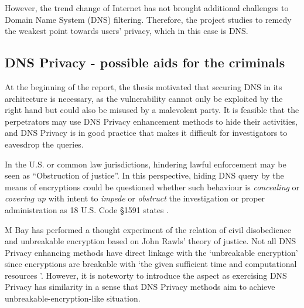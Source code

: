 However, the trend change of Internet has not brought additional challenges to Domain Name System (DNS) filtering. Therefore, the project studies to remedy the weakest point towards users' privacy, which in this case is DNS.

\subsection{DNS Privacy - possible aids for the criminals}
At the beginning of the report, the thesis motivated that securing DNS in its architecture is necessary, as the vulnerability cannot only be exploited by the right hand but could also be misused by a malevolent party.
It is feasible that the perpetrators may use DNS Privacy enhancement methods to hide their activities, and DNS Privacy is in good practice that makes it difficult for investigators to eavesdrop the queries.

In the U.S. or common law jurisdictions, hindering lawful enforcement may be seen as ``Obstruction of justice''.
In this perspective, hiding DNS query by the means of encryptions could be questioned whether such behaviour is \textit{concealing} or \textit{covering up} with intent to \textit{impede} or \textit{obstruct} the investigation or proper administration as 18 U.S. Code \S 1591 states \cite{Obstructionofjustice}.

M Bay has performed a thought experiment of the relation of civil disobedience and unbreakable encryption \cite{bay2017ethics} based on John Rawls' theory of justice.
Not all DNS Privacy enhancing methods have direct linkage with the `unbreakable encryption' since encryptions are breakable with `the given sufficient time and computational resources \cite{ellison2000ten,chau2006application}'.
However, it is noteworty to introduce the aspect as exercising DNS Privacy has similarity in a sense that DNS Privacy methods aim to achieve unbreakable-encryption-like situation.

